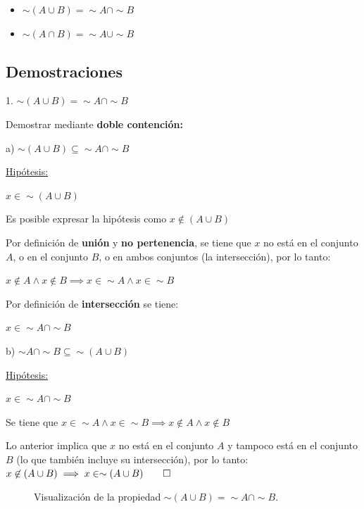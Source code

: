 \documentclass{article}
\begin{document}
\begin{itemize}
    \item $\sim(A \cup B) = \sim A \cap \sim B$
    \item $\sim(A \cap B) = \sim A \cup \sim B$
\end{itemize}

\subsection{Demostraciones}

1. $\sim(A \cup B) = \sim A \cap \sim B$

Demostrar mediante \textbf{doble contención:}

a) $\sim(A \cup B) \subseteq \sim A \cap \sim B$

\underline{Hipótesis:}

$x \in \sim(A \cup B)$

Es posible expresar la hipótesis como $x \not \in (A \cup B)$

Por definición de \textbf{unión} y \textbf{no pertenencia}, se tiene que $x$ no está en el conjunto $A$, o en el conjunto $B$, o en ambos conjuntos (la intersección), por lo tanto: 

$x \not \in A \land x \not \in B \implies x \in \sim A \land x \in \sim B$

Por definición de \textbf{intersección} se tiene:

$x \in \sim A \cap \sim B$

b) $\sim A \cap \sim B \subseteq \sim(A \cup B)$

\underline{Hipótesis:}

$x \in \sim A \cap \sim B$

Se tiene que $x \in \sim A \land x \in \sim B \implies x \not \in A \land x \not \in B$

Lo anterior implica que $x$ no está en el conjunto $A$ y tampoco está en el conjunto $B$ (lo que también incluye su intersección), por lo tanto: $x \not \in (A \cup B) \implies x \in \sim (A \cup B) \qed$

\begin{figure}[H]
    \centering
    \caption{Visualización de la propiedad $\sim(A \cup B) = \sim A \cap \sim B$.}
\end{figure}
\end{document}
